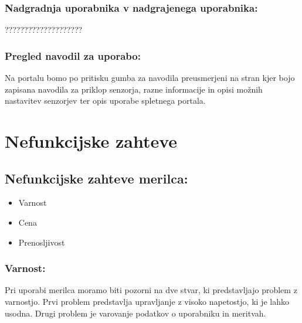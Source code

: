 \documentclass[12pt,a4paper,titlepage,openany]{report}
\begin{document}
\subsubsection{Nadgradnja uporabnika v nadgrajenega uporabnika:}

????????????????????

\subsubsection{Pregled navodil za uporabo:}

Na portalu bomo po pritisku gumba za navodila preusmerjeni na stran kjer bojo zapisana navodila za priklop senzorja, razne informacije in opisi možnih nastavitev senzorjev ter opis uporabe spletnega portala.

\section{Nefunkcijske zahteve}
\thispagestyle{fancy}


\subsection{Nefunkcijske zahteve merilca:}

\begin{itemize}
\item Varnost
\item Cena
\item Prenosljivost
\end{itemize}

\subsubsection{Varnost:}

Pri uporabi merilca moramo biti pozorni na dve stvar, ki predstavljajo problem z varnostjo. Prvi problem predstavlja upravljanje z visoko napetostjo, ki je lahko usodna. Drugi problem je varovanje podatkov o uporabniku in meritvah.
\end{document}
